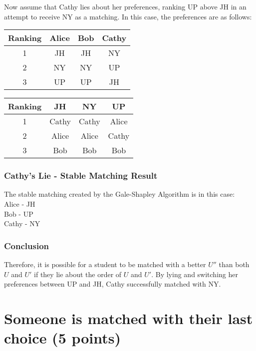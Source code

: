 \documentclass[11pt]{article}
\begin{document}
Now assume that Cathy lies about her preferences, ranking UP above JH in an attempt to receive NY as a matching. In this case, the preferences are as follows:

\vspace{5mm}
\noindent
\begin{minipage}{.5\textwidth}
\begin{tabular}{|c|ccc|}
\hline
    Ranking & Alice & Bob & Cathy \\ \hline
    1 & JH & JH & NY \\
    2 & NY & NY & UP \\
    3 & UP & UP & JH \\ \hline
\end{tabular}
\end{minipage}\hfill
\begin{minipage}{.35\textwidth}
    \begin{tabular}{|c|ccc|}
\hline
    Ranking & JH & NY & UP \\ \hline
    1 & Cathy & Cathy & Alice \\
    2 & Alice & Alice & Cathy \\
    3 & Bob & Bob & Bob \\ \hline
\end{tabular}
\end{minipage}

\subsubsection{Cathy's Lie - Stable Matching Result}

The stable matching created by the Gale-Shapley Algorithm is in this case: \\
Alice - JH \\
Bob - UP \\
Cathy - NY \\

\subsubsection{Conclusion}

Therefore, it is possible for a student to be matched with a better $U''$ than both $U$ and $U'$ if they lie about the order of $U$ and $U'$. By lying and switching her preferences between UP and JH, Cathy successfully matched with NY.




\section{Someone is matched with their last choice (5 points)}
\end{document}
